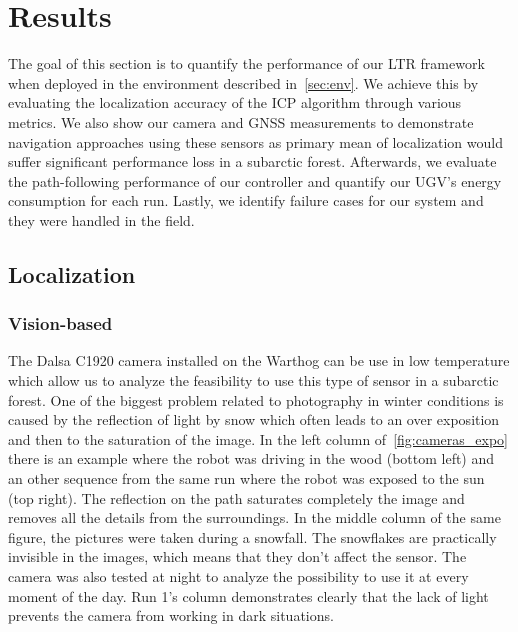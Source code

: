 \section{Results}
\label{sec:results}

The goal of this section is to quantify the performance of our \ac{LTR} framework when deployed in the environment described in~\autoref{sec:env}.
We achieve this by evaluating the localization accuracy of the \ac{ICP} algorithm through various metrics.
We also show our camera and \ac{GNSS} measurements to demonstrate navigation approaches using these sensors as primary mean of localization would suffer significant performance loss in a subarctic forest.
Afterwards, we evaluate the path-following performance of our controller and quantify our \ac{UGV}'s energy consumption for each run.
Lastly, we identify failure cases for our system and they were handled in the field.

\subsection{Localization}
\label{sec:res_loc}

\lightlipsum[1]

\subsubsection{Vision-based}
\label{sec:res_vis}


The Dalsa C1920 camera installed on the Warthog can be use in low temperature which allow us to analyze the feasibility to use this type of sensor in a subarctic forest. One of the biggest problem related to photography in winter conditions is caused by the reflection of light by snow which often leads to an over exposition and then to the saturation of the image. In the left column of~\autoref{fig:cameras_expo} there is an example where the robot was driving in the wood (bottom left) and an other sequence from the same run where the robot was exposed to the sun (top right). The reflection on the path saturates completely the image and removes all the details from the surroundings. In the middle column of the same figure, the pictures were taken during a snowfall. The snowflakes are practically invisible in the images, which means that they don't affect the sensor. The camera was also tested at night to analyze the possibility to use it at every moment of the day. Run 1's column demonstrates clearly that the lack of light prevents the camera from working in dark situations.

